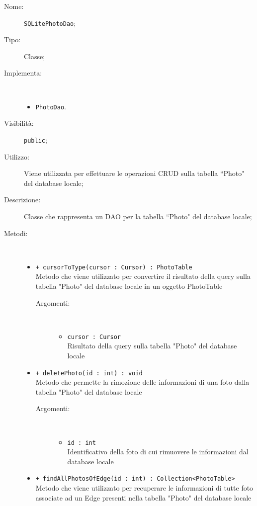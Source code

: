 \documentclass[../DefinizioneDiProdotto.tex]{subfiles}
\begin{document}
    \begin{description}
\item[Nome:] \texttt{SQLitePhotoDao};
\item[Tipo:] Classe;
\item[Implementa:] \
\begin{itemize}
\item \texttt{PhotoDao}.

\end{itemize}
\item[Visibilità:] \texttt{public};
\item[Utilizzo:] Viene utilizzata per effettuare le operazioni CRUD sulla tabella “Photo" del database locale;
\item[Descrizione:] Classe che rappresenta un DAO per la tabella “Photo" del database locale;
\item[Metodi:] \
\begin{itemize}
\item \texttt{+ cursorToType(cursor : Cursor) : PhotoTable}\\
Metodo che viene utilizzato per convertire il risultato della query sulla tabella "Photo" del database locale in un oggetto PhotoTable
 \begin{description}
\item[Argomenti:] \
\begin{itemize}
\item \texttt{cursor : Cursor}\\
Risultato della query sulla tabella "Photo" del database locale\end{itemize}
\end{description}
\item \texttt{+ deletePhoto(id : int) : void}\\
Metodo che permette la rimozione delle informazioni di una foto dalla tabella "Photo" del database locale
 \begin{description}
\item[Argomenti:] \
\begin{itemize}
\item \texttt{id : int}\\
Identificativo della foto di cui rimuovere le informazioni dal database locale\end{itemize}
\end{description}
\item \texttt{+ findAllPhotosOfEdge(id : int) : Collection<PhotoTable>}\\
Metodo che viene utilizzato per recuperare le informazioni di tutte foto associate ad un Edge presenti nella tabella "Photo" del database locale

\end{itemize}
\end{description}
\end{document}
